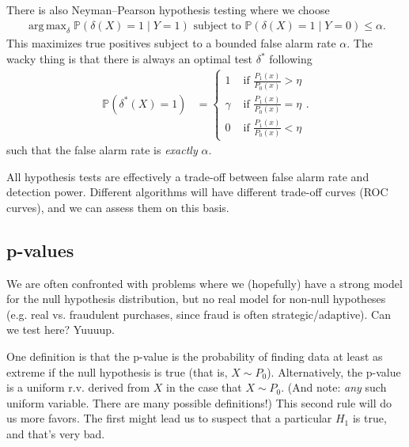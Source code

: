 \documentclass[11pt,letterpaper]{article}
\DeclareMathOperator*{\argmax}{arg\,max}
\theoremstyle{definition}
\numberwithin{equation}{section}
\numberwithin{figure}{section}
\begin{document}
There is also Neyman--Pearson hypothesis testing where we choose
%
\begin{align}
	\argmax_\delta \mathbb{P}(\delta(X) = 1 \mid Y=1) \text{ subject to } \mathbb{P}(\delta(X)=1\mid Y=0) \leq \alpha.
\end{align}
%
This maximizes true positives subject to a bounded false alarm rate $\alpha$. The wacky thing is that there is always an optimal test $\delta^\ast$ following
%
\begin{align}
	\mathbb{P}(\delta^\ast(X) =1) &= \left\{\begin{array}{lr}
		1 & \text{ if } \frac{P_1(x)}{P_0(x)} > \eta\\
		\gamma & \text{ if } \frac{P_1(x)}{P_0(x)} = \eta\\
		0 & \text{ if } \frac{P_1(x)}{P_0(x)} < \eta
	\end{array}\right..
\end{align}
%
such that the false alarm rate is \emph{exactly} $\alpha$.

All hypothesis tests are effectively a trade-off between false alarm rate and detection power. Different algorithms will have different trade-off curves (ROC curves), and we can assess them on this basis.














\subsection{p-values}
We are often confronted with problems where we (hopefully) have a strong model for the null hypothesis distribution, but no real model for non-null hypotheses (e.g. real vs. fraudulent purchases, since fraud is often strategic/adaptive). Can we test here? Yuuuup.



One definition is that the p-value is the probability of finding data at least as extreme if the null hypothesis is true (that is, $X \sim P_0$). Alternatively, the p-value is a uniform r.v. derived from $X$ in the case that $X \sim P_0$. (And note: \emph{any} such uniform variable. There are many possible definitions!) This second rule will do us more favors. The first might lead us to suspect that a particular $H_1$ is true, and that's very bad.
\end{document}
